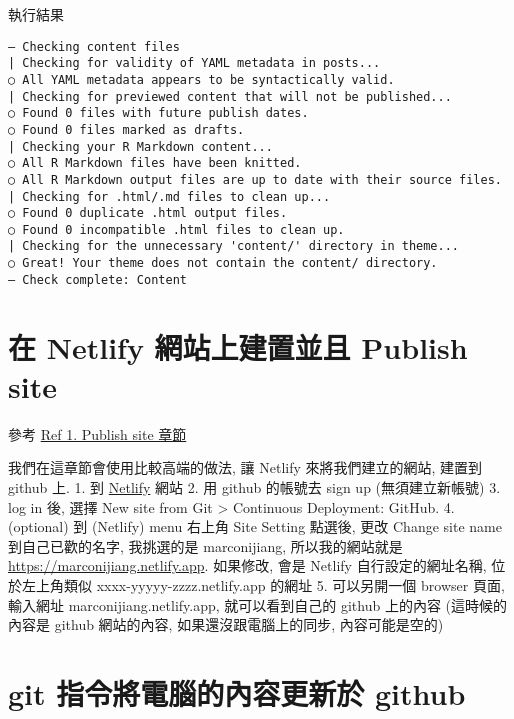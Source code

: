 \documentclass[
]{book}
\begin{document}
執行結果

\begin{verbatim}
― Checking content files
| Checking for validity of YAML metadata in posts...
○ All YAML metadata appears to be syntactically valid.
| Checking for previewed content that will not be published...
○ Found 0 files with future publish dates.
○ Found 0 files marked as drafts.
| Checking your R Markdown content...
○ All R Markdown files have been knitted.
○ All R Markdown output files are up to date with their source files.
| Checking for .html/.md files to clean up...
○ Found 0 duplicate .html output files.
○ Found 0 incompatible .html files to clean up.
| Checking for the unnecessary 'content/' directory in theme...
○ Great! Your theme does not contain the content/ directory.
― Check complete: Content
\end{verbatim}

\hypertarget{ux5728-netlify-ux7db2ux7ad9ux4e0aux5efaux7f6eux4e26ux4e14-publish-site}{%
\section{在 Netlify 網站上建置並且 Publish site}\label{ux5728-netlify-ux7db2ux7ad9ux4e0aux5efaux7f6eux4e26ux4e14-publish-site}}

參考 \href{https://alison.rbind.io/post/new-year-new-blogdown/\#step-5-publish-site}{Ref 1. Publish site 章節}

我們在這章節會使用比較高端的做法, 讓 Netlify 來將我們建立的網站, 建置到 github 上.
1. 到 \href{https://www.netlify.com/}{Netlify} 網站
2. 用 github 的帳號去 sign up (無須建立新帳號)
3. log in 後, 選擇 New site from Git \textgreater{} Continuous Deployment: GitHub.
4. (optional) 到 (Netlify) menu 右上角 Site Setting 點選後, 更改 Change site name 到自己已歡的名字, 我挑選的是 marconijiang, 所以我的網站就是 \url{https://marconijiang.netlify.app}. 如果修改, 會是 Netlify 自行設定的網址名稱, 位於左上角類似 xxxx-yyyyy-zzzz.netlify.app 的網址
5. 可以另開一個 browser 頁面, 輸入網址 marconijiang.netlify.app, 就可以看到自己的 github 上的內容 (這時候的內容是 github 網站的內容, 如果還沒跟電腦上的同步, 內容可能是空的)

\hypertarget{git-ux6307ux4ee4ux5c07ux96fbux8166ux7684ux5167ux5bb9ux66f4ux65b0ux65bc-github}{%
\section{git 指令將電腦的內容更新於 github}\label{git-ux6307ux4ee4ux5c07ux96fbux8166ux7684ux5167ux5bb9ux66f4ux65b0ux65bc-github}}
\end{document}
